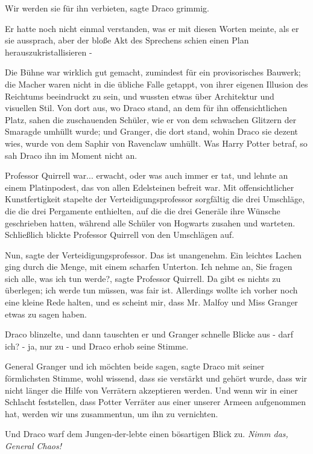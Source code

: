 \glqq{}Wir werden sie für ihn verbieten\grqq{}, sagte Draco grimmig.

Er hatte noch nicht einmal verstanden, was er mit diesen Worten meinte, als er
sie aussprach, aber der bloße Akt des Sprechens schien einen Plan
herauszukristallisieren -

Die Bühne war wirklich gut gemacht, zumindest für ein provisorisches Bauwerk;
die Macher waren nicht in die übliche Falle getappt, von ihrer eigenen Illusion
des Reichtums beeindruckt zu sein, und wussten etwas über Architektur und
visuellen Stil. Von dort aus, wo Draco stand, an dem für ihn offensichtlichen
Platz, sahen die zuschauenden Schüler, wie er von dem schwachen Glitzern der
Smaragde umhüllt wurde; und Granger, die dort stand, wohin Draco sie dezent
wies, wurde von dem Saphir von Ravenclaw umhüllt. Was Harry Potter betraf, so
sah Draco ihn im Moment nicht an.

Professor Quirrell war... erwacht, oder was auch immer er tat, und lehnte an
einem Platinpodest, das von allen Edelsteinen befreit war. Mit offensichtlicher
Kunstfertigkeit stapelte der Verteidigungsprofessor sorgfältig die drei
Umschläge, die die drei Pergamente enthielten, auf die die drei Generäle ihre
Wünsche geschrieben hatten, während alle Schüler von Hogwarts zusahen und
warteten. Schließlich blickte Professor Quirrell von den Umschlägen auf.

\glqq{}Nun\grqq{}, sagte der Verteidigungsprofessor. \glqq{}Das ist unangenehm.\grqq{}
Ein leichtes Lachen ging durch die Menge, mit einem scharfen Unterton. \glqq{}Ich
nehme an, Sie fragen sich alle, was ich tun werde?\grqq{}, sagte Professor
Quirrell. \glqq{}Da gibt es nichts zu überlegen; ich werde tun müssen, was fair
ist. Allerdings wollte ich vorher noch eine kleine Rede halten, und es scheint
mir, dass Mr. Malfoy und Miss Granger etwas zu sagen haben.\grqq{}

Draco blinzelte, und dann tauschten er und Granger schnelle Blicke aus - darf
ich? - ja, nur zu - und Draco erhob seine Stimme.

\glqq{}General Granger und ich möchten beide sagen\grqq{}, sagte Draco mit seiner
förmlichsten Stimme, wohl wissend, dass sie verstärkt und gehört wurde, \glqq{}
dass wir nicht länger die Hilfe von Verrätern akzeptieren werden. Und wenn wir
in einer Schlacht feststellen, dass Potter Verräter aus einer unserer Armeen
aufgenommen hat, werden wir uns zusammentun, um ihn zu vernichten.\grqq{}

Und Draco warf dem Jungen-der-lebte einen bösartigen Blick zu.
\emph{Nimm das, General Chaos!}

